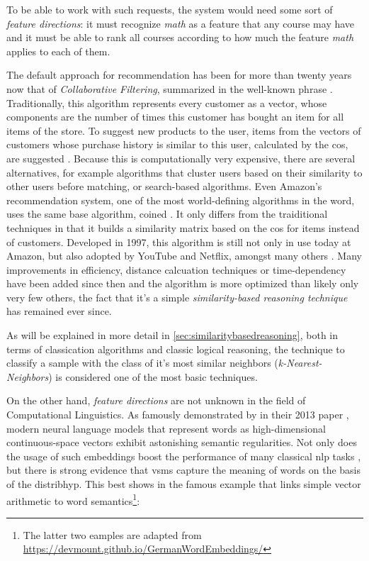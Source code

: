 To be able to work with such requests, the system would need some sort of \textit{feature directions}: it must recognize \emph{math} as a feature that any course may have and it must be able to rank all courses according to how much the feature \emph{math} applies to each of them.


\label{sec:amazonalgo}

The default approach for recommendation has been for more than twenty years now that of \emph{Collaborative Filtering}, summarized in the well-known phrase  \cite{Sarwar2000}. Traditionally, this algorithm represents every customer as a vector, whose components are the number of times this customer has bought an item for all items of the store. To suggest new products to the user, items from the vectors of customers whose purchase history is similar to this user, calculated by \eg the \gls{cos}, are suggested \cite{Linden2003}. Because this is computationally very expensive, there are several alternatives, for example algorithms that cluster users based on their similarity to other users before matching, or search-based algorithms. Even Amazon's recommendation system, one of the most world-defining algorithms in the word, uses the same base algorithm, coined . It only differs from the traiditional techniques in that it builds a similarity matrix based on the \gls{cos} for items instead of customers. Developed in 1997, this algorithm is still not only in use today at Amazon, but also adopted by YouTube and Netflix, amongst many others \cite{Smith2017}. Many improvements in efficiency, distance calcuation techniques or time-dependency have been added since then and the algorithm is more optimized than likely only very few others, the fact that it's a simple \textit{similarity-based reasoning technique} has remained ever since. 

As will be explained in more detail in \autoref{sec:similaritybasedreasoning}, both in terms of classication algorithms and classic logical reasoning, the technique to classify a sample with the class of it's most similar neighbors (\emph{k-Nearest-Neighbors}) is considered one of the most basic techniques.

On the other hand, \textit{feature directions} are not unknown in the field of Computational Linguistics. As famously demonstrated by \textcite{Mikolov:Regularities} in their 2013 paper , modern neural language models that represent words as high-dimensional continuous-space vectors exhibit astonishing semantic regularities. Not only does the usage of such embeddings boost the performance of many classical \gls{nlp} tasks \cite{Mikolov2013a,Le2014, Devlin2019}, but there is strong evidence that \glspl{vsm} capture the meaning of words on the basis of the \gls{distribhyp}. This best shows in the famous example that links simple vector arithmetic to word semantics\footnote{The latter two eamples are adapted from \url{https://devmount.github.io/GermanWordEmbeddings/}}:

